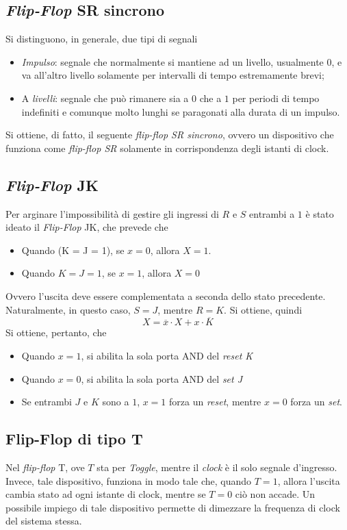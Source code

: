 \documentclass[a4paper]{extarticle}
\begin{document}
\subsection{\textit{Flip-Flop} SR sincrono}
Si distinguono, in generale, due tipi di segnali
\begin{itemize}
    \item \textit{Impulso}: segnale che normalmente si mantiene ad un livello, usualmente \(0\), e va all'altro livello solamente per intervalli di tempo estremamente brevi;

    \item A \textit{livelli}: segnale che può rimanere sia a \(0\) che a \(1\) per periodi di tempo indefiniti e comunque molto lunghi se paragonati alla durata di un impulso.
\end{itemize}
Si ottiene, di fatto, il seguente \textit{flip-flop SR sincrono}, ovvero un dispositivo che funziona come \textit{flip-flop SR} solamente in corrispondenza degli istanti di clock.

\subsection{\textit{Flip-Flop} JK}
Per arginare l'impossibilità di gestire gli ingressi di \(R\) e \(S\) entrambi a \(1\) è stato ideato il \textit{Flip-Flop} JK, che prevede che
\begin{itemize}
    \item Quando (K = J = 1), se \(x = 0\), allora \(X = 1\).
    \item Quando \(K = J = 1\), se \(x = 1\), allora \(X = 0\)
\end{itemize}
Ovvero l'uscita deve essere complementata a seconda dello stato precedente. Naturalmente, in questo caso, \(S = J\), mentre \(R = K\). Si ottiene, quindi
\[X = \overline{x} \cdot X + x \cdot \overline{K}\]
Si ottiene, pertanto, che
\begin{itemize}
    \item Quando \(x = 1\), si abilita la sola porta AND del \textit{reset K}
    \item Quando \(x = 0\), si abilita la sola porta AND del \textit{set J}
    \item Se entrambi \(J\) e \(K\) sono a \(1\), \(x = 1\) forza un \textit{reset}, mentre \(x = 0\) forza un \textit{set}.
\end{itemize}

\subsection{Flip-Flop di tipo T}
Nel \textit{flip-flop} T, ove \(T\) sta per \textit{Toggle}, mentre il \textit{clock} è il solo segnale d'ingresso. Invece, tale dispositivo, funziona in modo tale che, quando \(T = 1\), allora l'uscita cambia stato ad ogni istante di clock, mentre se \(T = 0\) ciò non accade. Un possibile impiego di tale dispositivo permette di dimezzare la frequenza di clock del sistema stessa.
\end{document}
